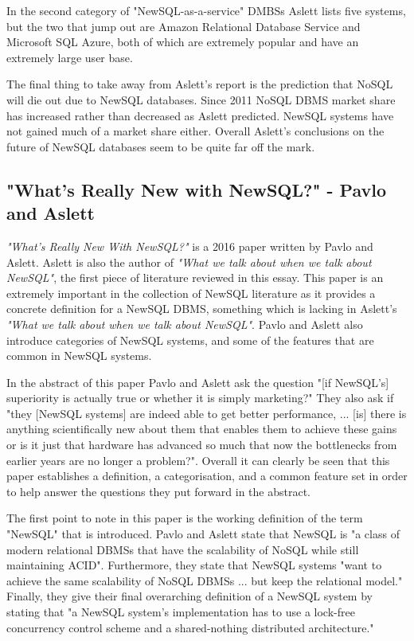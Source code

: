 \documentclass[10pt, conference]{IEEEtran}
\begin{document}
In the second category of "NewSQL-as-a-service" DMBSs Aslett lists five systems, but the two that jump out are Amazon Relational Database Service and Microsoft SQL Azure, both of which are extremely popular and have an extremely large user base. 

The final thing to take away from Aslett's report is the prediction that NoSQL will die out due to NewSQL databases. Since 2011 NoSQL DBMS market share has increased \cite{nosql} rather than decreased as Aslett predicted. NewSQL systems have not gained much of a market share either. Overall Aslett's conclusions on the future of NewSQL databases seem to be quite far off the mark.

\subsection{"What's Really New with NewSQL?" - Pavlo and Aslett}

\textit{"What's Really New With NewSQL?"} \cite{pavlo} is a 2016 paper written by Pavlo and Aslett. Aslett is also the author of \textit{"What we talk about when we talk about NewSQL"}, the first piece of literature reviewed in this essay. This paper is an extremely important in the collection of NewSQL literature as it provides a concrete definition for a NewSQL DBMS, something which is lacking in Aslett's \textit{"What we talk about when we talk about NewSQL"}. Pavlo and Aslett also introduce categories of NewSQL systems, and some of the features that are common in NewSQL systems.

In the abstract of this paper Pavlo and Aslett ask the question "[if NewSQL's] superiority is actually true or whether it is simply marketing?" They also ask if "they [NewSQL systems] are indeed able to get better performance, ... [is] there is anything scientifically new about them that enables them to achieve these gains or is it just that hardware has advanced so much that now the bottlenecks from earlier years are no longer a problem?". Overall it can clearly be seen that this paper establishes a definition, a categorisation, and a common feature set in order to help answer the questions they put forward in the abstract.

The first point to note in this paper is the working definition of the term "NewSQL" that is introduced. Pavlo and Aslett state that NewSQL is "a class of modern relational DBMSs that have the scalability of NoSQL while still maintaining ACID". Furthermore, they state that NewSQL systems "want to achieve the same scalability of NoSQL DBMSs ... but keep the relational model." Finally, they give their final overarching definition of a NewSQL system by stating that "a NewSQL system's implementation has to use a lock-free concurrency control scheme and a shared-nothing distributed architecture." 
\end{document}
